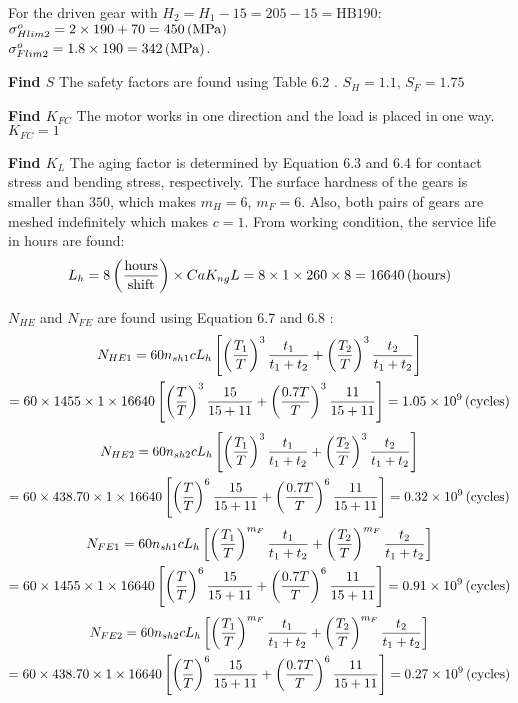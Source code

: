 For the driven gear with $ H_2=H_1-15=205-15=\text{HB}190 $:\\
$ \sigma_{Hlim2}^o = 2 \times 190 + 70 = 450 \, (\mathrm{MPa})$\\
$ \sigma_{Flim2}^o = 1.8\times 190 = 342 \, (\mathrm{MPa})$.

\textbf{Find $ S $} The safety factors are found using Table 6.2 \cite{tk1}. $ S_H=1.1 $, $ S_F=1.75 $

\textbf{Find $ K_{FC} $} The motor works in one direction and the load is placed in one way. $ K_{FC} = 1$

\textbf{Find $ K_L $} The aging factor is determined by Equation 6.3 and 6.4 \cite{tk1} for contact stress and bending stress, respectively. The surface hardness of the gears is smaller than $ 350 $, which makes $ m_H=6 $, $ m_F=6 $. Also, both pairs of gears are meshed indefinitely which makes $ c=1 $. From working condition, the service life in hours are found:
\[L_h = 8\, \mathrm{\left( \dfrac{hours}{shift}\right)}\times Ca  K_{ng} L= 8 \times 1\times 260\times 8 = 16640\, (\mathrm{hours})\]

$ N_{HE} $ and $ N_{FE} $ are found using Equation 6.7 and 6.8 \cite{tk1}:
\begin{multline*}
N_{HE1} = 60n_{sh1}cL_h\left[ \left( \dfrac{T_1}{T}\right)^3\dfrac{t_1}{t_1+t_2} + \left( \dfrac{T_2}{T}\right)^3\dfrac{t_2}{t_1+t_2}\right] \\
= 60 \times 1455 \times 1 \times 16640 \left[ \left( \dfrac{T}{T}\right)^3\dfrac{15}{15+11} + \left( \dfrac{0.7T}{T}\right)^3\dfrac{11}{15+11}\right] = 1.05 \times10^9\, (\mathrm{cycles})
\end{multline*}
\begin{multline*}
N_{HE2} = 60n_{sh2}cL_h\left[ \left( \dfrac{T_1}{T}\right)^3\dfrac{t_1}{t_1+t_2} + \left( \dfrac{T_2}{T}\right)^3\dfrac{t_2}{t_1+t_2}\right]\\
= 60 \times 438.70 \times 1 \times 16640 \left[ \left( \dfrac{T}{T}\right)^6\dfrac{15}{15+11} + \left( \dfrac{0.7T}{T}\right)^6\dfrac{11}{15+11}\right] = 0.32 \times10^9\, (\mathrm{cycles})
\end{multline*}
\begin{multline*}
N_{FE1} = 60n_{sh1}cL_h\left[ \left( \dfrac{T_1}{T}\right)^{m_F}\dfrac{t_1}{t_1+t_2} + \left( \dfrac{T_2}{T}\right)^{m_F}\dfrac{t_2}{t_1+t_2}\right] \\
= 60 \times 1455 \times 1 \times 16640 \left[ \left( \dfrac{T}{T}\right)^6\dfrac{15}{15+11} + \left( \dfrac{0.7T}{T}\right)^6\dfrac{11}{15+11}\right] = 0.91 \times10^9\, (\mathrm{cycles})
\end{multline*}
\begin{multline*} 
N_{FE2} = 60n_{sh2}cL_h\left[ \left( \dfrac{T_1}{T}\right)^{m_F}\dfrac{t_1}{t_1+t_2} + \left( \dfrac{T_2}{T}\right)^{m_F}\dfrac{t_2}{t_1+t_2}\right]\\
= 60 \times 438.70 \times 1 \times 16640 \left[ \left( \dfrac{T}{T}\right)^6\dfrac{15}{15+11} + \left( \dfrac{0.7T}{T}\right)^6\dfrac{11}{15+11}\right] = 0.27 \times10^9\, (\mathrm{cycles})
\end{multline*}

